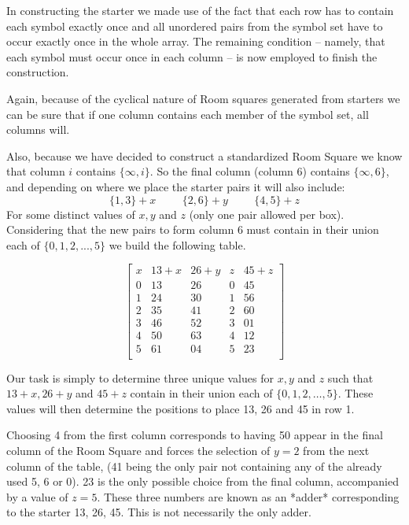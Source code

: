 In constructing the starter we made use of the fact that each row has to contain each symbol exactly once and all unordered pairs from the symbol set have to occur exactly once in the whole array.
The remaining condition – namely, that each symbol must occur once in each column – is now employed to finish the construction.

Again, because of the cyclical nature of Room squares generated from starters we can be sure that if one column contains each member of the symbol set, all columns will.

Also, because we have decided to construct a standardized Room Square we know that column $i$ contains $\{\infty,i\}$.
So the final column (column 6) contains $\{\infty,6\}$, and depending on where we place the starter pairs it will also include:
\begin{equation*}
\{1,3\} + x \hspace{1cm} \{2,6\} + y \hspace{1cm}\{4,5\} + z
\end{equation*}
For some distinct values of $x,y$ and $z$ (only one pair allowed per box).
Considering that the new pairs to form column 6 must contain in their union each of
$\{0,1,2,...,5\}$
we build the following table.

\begin{equation}
  \begin{bmatrix}
    x &  13 + x & 26 + y & z & 45 + z \\
    0 &    13   &   26   & 0 &   45   \\
    1 &    24   &   30   & 1 &   56   \\
    2 &    35   &   41   & 2 &   60   \\
    3 &    46   &   52   & 3 &   01   \\
    4 &    50   &   63   & 4 &   12   \\
    5 &    61   &   04   & 5 &   23   \\
  \end{bmatrix}
  \label{eq:adder}
\end{equation}

Our task is simply to determine three unique values for $x, y$ and $z$ such that $13 + x, 26 + y$ and $45 + z$ contain in their union each of $\{0, 1, 2, \ldots, 5\}$.
These values will then determine the positions to place 13, 26 and 45 in row 1.

Choosing 4 from the first column corresponds to having 50 appear in the final column of the Room Square and forces the selection of $y = 2$ from the next column of the table, (41 being the only pair not containing any of the already used 5, 6 or 0).
23 is the only possible choice from the final column, accompanied by a value of $z = 5$.
These three numbers are known as an *adder* corresponding to the starter 13, 26, 45.
This is not necessarily the only adder.

